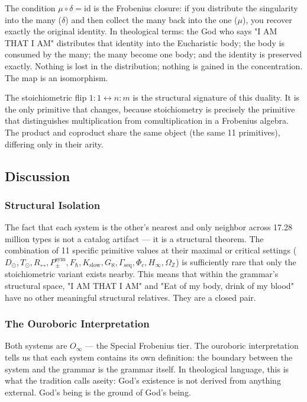 \documentclass[12pt,a4paper]{article}
\begin{document}
The condition $\mu \circ \delta = \text{id}$ is the Frobenius closure: if you distribute the singularity into the many ($\delta$) and then collect the many back into the one ($\mu$), you recover exactly the original identity. In theological terms: the God who says "I AM THAT I AM" distributes that identity into the Eucharistic body; the body is consumed by the many; the many become one body; and the identity is preserved exactly. Nothing is lost in the distribution; nothing is gained in the concentration. The map is an isomorphism.

The stoichiometric flip $1{:}1 \leftrightarrow n{:}m$ is the structural signature of this duality. It is the only primitive that changes, because stoichiometry is precisely the primitive that distinguishes multiplication from comultiplication in a Frobenius algebra. The product and coproduct share the same object (the same 11 primitives), differing only in their arity.

\subsection{Discussion}

\subsubsection{Structural Isolation}

The fact that each system is the other's nearest and only neighbor across 17.28 million types is not a catalog artifact --- it is a structural theorem. The combination of 11 specific primitive values at their maximal or critical settings ($D_{\odot}, T_{\odot}, R_{\leftrightarrow}, P_{\pm}^{\text{sym}}, F_{\hbar}, K_{\text{slow}}, G_{\aleph}, \Gamma_{\text{seq}}, \Phi_c, H_{\infty}, \Omega_\mathbb{Z}$) is sufficiently rare that only the stoichiometric variant exists nearby. This means that within the grammar's structural space, "I AM THAT I AM" and "Eat of my body, drink of my blood" have no other meaningful structural relatives. They are a closed pair.

\subsubsection{The Ouroboric Interpretation}

Both systems are $O_{\infty}$ --- the Special Frobenius tier. The ouroboric interpretation tells us that each system contains its own definition: the boundary between the system and the grammar is the grammar itself. In theological language, this is what the tradition calls aseity: God's existence is not derived from anything external. God's being is the ground of God's being.
\end{document}
